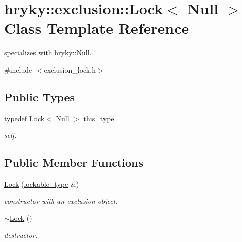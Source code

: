 \hypertarget{classhryky_1_1exclusion_1_1_lock_3_01_null_01_4}{\section{hryky\-:\-:exclusion\-:\-:Lock$<$ Null $>$ Class Template Reference}
\label{classhryky_1_1exclusion_1_1_lock_3_01_null_01_4}
}


specializes with \hyperlink{classhryky_1_1_null}{hryky\-::\-Null}.  




{\ttfamily \#include $<$exclusion\-\_\-lock.\-h$>$}

\subsection*{Public Types}
\begin{DoxyCompactItemize}
\item 
\hypertarget{classhryky_1_1exclusion_1_1_lock_3_01_null_01_4_ad79e43236a5dc738e5428276388c135a}{typedef \hyperlink{classhryky_1_1exclusion_1_1_lock}{Lock}$<$ \hyperlink{classhryky_1_1_null}{Null} $>$ \hyperlink{classhryky_1_1exclusion_1_1_lock_3_01_null_01_4_ad79e43236a5dc738e5428276388c135a}{this\-\_\-type}}\label{classhryky_1_1exclusion_1_1_lock_3_01_null_01_4_ad79e43236a5dc738e5428276388c135a}

\begin{DoxyCompactList}\small\item\em self. \end{DoxyCompactList}\end{DoxyCompactItemize}
\subsection*{Public Member Functions}
\begin{DoxyCompactItemize}
\item 
\hypertarget{classhryky_1_1exclusion_1_1_lock_3_01_null_01_4_ad752a87340c841e26e5c9d9dbc486326}{\hyperlink{classhryky_1_1exclusion_1_1_lock_3_01_null_01_4_ad752a87340c841e26e5c9d9dbc486326}{Lock} (\hyperlink{classhryky_1_1_null}{lockable\-\_\-type} \&)}\label{classhryky_1_1exclusion_1_1_lock_3_01_null_01_4_ad752a87340c841e26e5c9d9dbc486326}

\begin{DoxyCompactList}\small\item\em constructor with an exclusion object. \end{DoxyCompactList}\item 
\hypertarget{classhryky_1_1exclusion_1_1_lock_3_01_null_01_4_a95e2cdc49825965bf6eaf5d4d16cff01}{\hyperlink{classhryky_1_1exclusion_1_1_lock_3_01_null_01_4_a95e2cdc49825965bf6eaf5d4d16cff01}{$\sim$\-Lock} ()}\label{classhryky_1_1exclusion_1_1_lock_3_01_null_01_4_a95e2cdc49825965bf6eaf5d4d16cff01}

\begin{DoxyCompactList}\small\item\em destructor. \end{DoxyCompactList}\end{DoxyCompactItemize}


